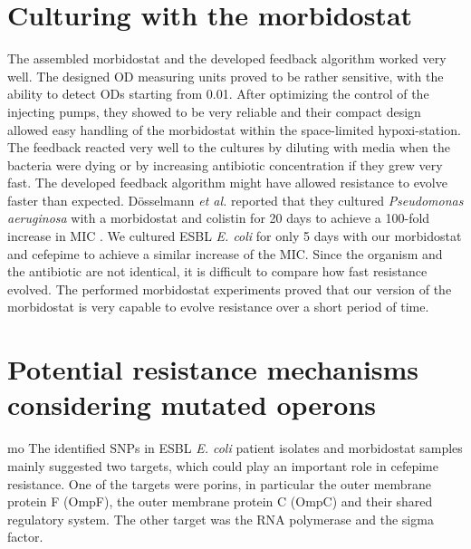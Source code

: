 \section{Culturing with the morbidostat}
The assembled morbidostat and the developed feedback algorithm worked very well. The designed OD measuring units proved to be rather sensitive, with the ability to detect ODs starting from 0.01. After optimizing the control of the injecting pumps, they showed to be very reliable and their compact design allowed easy handling of the morbidostat within the space-limited hypoxi-station.
The feedback reacted very well to the cultures by diluting with media when the bacteria were dying or by increasing antibiotic concentration if they grew very fast. The developed feedback algorithm might have allowed resistance to evolve faster than expected. Dösselmann \textit{et al.} reported that they cultured \textit{Pseudomonas aeruginosa} with a morbidostat and colistin for 20 days to achieve a 100-fold increase in MIC \cite{doselmann_rapid_2017}. We cultured ESBL \textit{E. coli} for only 5 days with our morbidostat and cefepime to achieve a similar increase of the MIC. Since the organism and the antibiotic are not identical, it is difficult to compare how fast resistance evolved. The performed morbidostat experiments proved that our version of the morbidostat is very capable to evolve resistance over a short period of time. 

\section{Potential resistance mechanisms considering mutated operons}mo
The identified SNPs in ESBL \textit{E. coli} patient isolates and morbidostat samples mainly suggested two targets, which could play an important role in cefepime resistance. One of the targets were porins, in particular the outer membrane protein F (OmpF), the outer membrane protein C (OmpC)  and their shared regulatory system. The other target was the RNA polymerase and the sigma factor. 
